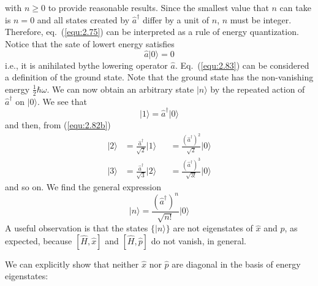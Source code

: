 with $n \geq 0$ to provide reasonable results. Since the
smallest value that $n$ can take is $n = 0$ and all states
created by $\hat{a}^{\dagger}$ differ by a unit of $n$, $n$
must be integer. Therefore, eq.~(\ref{equ:2.75}) can be
interpreted as a rule of energy quantization.
Notice that the sate of lowert energy satisfies
\begin{equation}
  \hat{a}\vert 0\rangle  = 0
  \label{equ:2.83}
\end{equation}
i.e., it is anihilated bythe lowering operator $\hat{a}$.
Eq.~(\ref{equ:2.83}) can be considered a definition of the
ground state. Note that the ground state has the
non-vanishing energy $\displaystyle{\frac{1}{2}\hbar
\omega}$.
We can now obtain an arbitrary state $\vert n\rangle $ by the repeated
action of $\hat{a}^{\dagger}$ on $\vert 0\rangle $. We see that
\begin{equation}
  \vert 1\rangle  = \hat{a}^{\dagger} \vert 0\rangle 
  \label{equ:2.84}
\end{equation}
and then, from (\ref{equ:2.82b})
\begin{subequations}
  \begin{alignat}{2}
    \vert 2\rangle  &= \frac{\hat{a}^{\dagger}}{\sqrt{2}} \vert 1\rangle  &&=
    \frac{(\hat{a}^{\dagger})^2}{\sqrt{2}} \vert 0\rangle 
    \label{equ:2.85a} \\
    \vert 3\rangle  &= \frac{\hat{a}^{\dagger}}{\sqrt{3}} \vert 2\rangle  &&=
    \frac{(\hat{a}^{\dagger})^3}{\sqrt{3!}} \vert 0\rangle 
    \label{equ:2.85b}
  \end{alignat}
\end{subequations}
and so on. We find the general expression
\begin{equation}
  \vert n\rangle  = \frac{(\hat{a}^{\dagger})^n}{\sqrt{n!}} \vert 0\rangle 
  \label{equ:2.86}
\end{equation}
A useful observation is that the states $\{\vert n\rangle \}$ are not
eigenstates of $\hat{x}$ and $\hat{p}$, as expected, because
$[\hat{H},\hat{x}]$ and $[\hat{H}, \hat{p}]$ do not vanish,
in general.

We can explicitly show that neither $\hat{x}$ nor $\hat{p}$
are diagonal in the basis of energy eigenstates:

